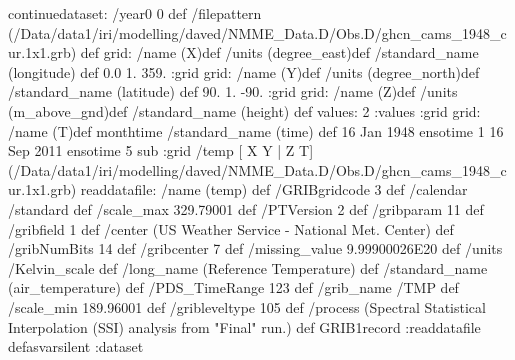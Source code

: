 \begin{ingrid}
continuedataset:
 /year0 0 def
 /filepattern (/Data/data1/iri/modelling/daved/NMME_Data.D/Obs.D/ghcn_cams_1948_cur.1x1.grb) def
grid:
/name (X)def
/units (degree_east)def
/standard_name (longitude) def
 0.0 1. 359.
:grid
grid:
/name (Y)def
/units (degree_north)def
/standard_name (latitude) def
 90. 1. -90.
:grid
grid:
/name (Z)def
/units (m_above_gnd)def
/standard_name (height) def
values: 2 :values
:grid
grid:
/name (T)def
monthtime
/standard_name (time) def
16 Jan 1948 ensotime
1
16 Sep 2011 ensotime 5 sub
:grid
 /temp{
[ X Y | Z T] (/Data/data1/iri/modelling/daved/NMME_Data.D/Obs.D/ghcn_cams_1948_cur.1x1.grb) readdatafile:
/name (temp) def
 /GRIBgridcode 3 def
 /calendar /standard def
 /scale_max 329.79001 def
 /PTVersion 2 def
 /gribparam 11 def
 /gribfield 1 def
 /center (US Weather Service - National Met. Center) def
 /gribNumBits 14 def
 /gribcenter 7 def
 /missing_value 9.99900026E20 def
 /units /Kelvin_scale def
 /long_name (Reference Temperature) def
/standard_name (air_temperature) def
 /PDS_TimeRange 123 def
 /grib_name /TMP def
 /scale_min 189.96001 def
 /gribleveltype 105 def
 /process (Spectral Statistical Interpolation (SSI) analysis from "Final" run.) def
 GRIB1record :readdatafile
}defasvarsilent
:dataset
\end{ingrid}
